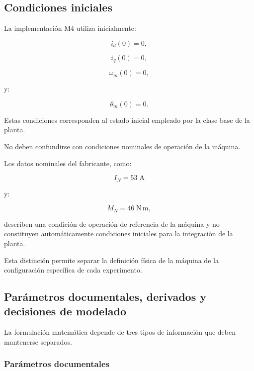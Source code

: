 \subsection{Condiciones iniciales}

La implementación M4 utiliza inicialmente:

\begin{equation}
i_d(0)=0,
\end{equation}

\begin{equation}
i_q(0)=0,
\end{equation}

\begin{equation}
\omega_m(0)=0,
\end{equation}

y:

\begin{equation}
\theta_m(0)=0.
\end{equation}

Estas condiciones corresponden al estado inicial empleado por la clase base de la planta.

No deben confundirse con condiciones nominales de operación de la máquina.

Los datos nominales del fabricante, como:

\begin{equation}
I_N=53\;\mathrm{A}
\end{equation}

y:

\begin{equation}
M_N=46\;\mathrm{N\,m},
\end{equation}

describen una condición de operación de referencia de la máquina y no constituyen automáticamente condiciones iniciales para la integración de la planta.

Esta distinción permite separar la definición física de la máquina de la configuración específica de cada experimento.

\subsection{Parámetros documentales, derivados y decisiones de modelado}

La formulación matemática depende de tres tipos de información que deben mantenerse separados.

\subsubsection{Parámetros documentales}

